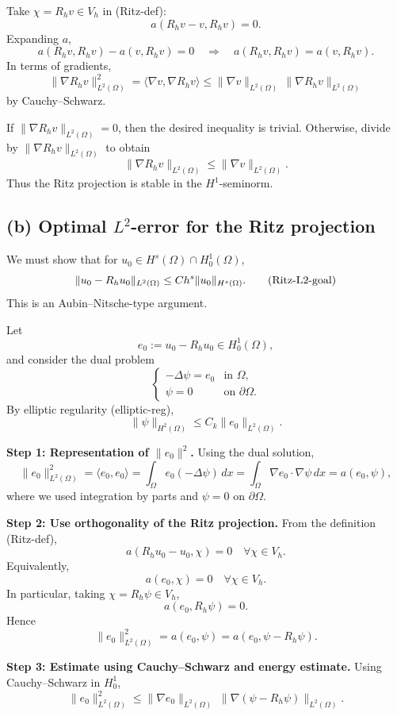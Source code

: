 Take $\chi = R_h v\in V_h$ in (Ritz-def):
\[
    a(R_h v - v, R_h v) = 0.
\]
Expanding $a$,
\[
    a(R_h v, R_h v) - a(v,R_h v) = 0
    \quad\Longrightarrow\quad
    a(R_h v,R_h v) = a(v,R_h v).
\]
In terms of gradients,
\[
    \|\nabla R_h v\|_{L^2(\Omega)}^2
    = \langle \nabla v,\nabla R_h v\rangle
    \le \|\nabla v\|_{L^2(\Omega)}\,\|\nabla R_h v\|_{L^2(\Omega)}
\]
by Cauchy--Schwarz.

If $\|\nabla R_h v\|_{L^2(\Omega)}=0$, then the desired inequality is trivial.
Otherwise, divide by $\|\nabla R_h v\|_{L^2(\Omega)}$ to obtain
\[
    \|\nabla R_h v\|_{L^2(\Omega)} \le \|\nabla v\|_{L^2(\Omega)}.
\]
Thus the Ritz projection is stable in the $H^1$-seminorm.

\subsection*{(b) Optimal $L^2$-error for the Ritz projection}

We must show that for $u_0\in H^s(\Omega)\cap H_0^1(\Omega)$,
\[
    \|u_0 - R_h u_0\|_{L^2(\Omega)} \le C h^s \|u_0\|_{H^s(\Omega)}. \tag{\text{Ritz-L2-goal}}
\]
This is an Aubin--Nitsche-type argument.

Let
\[
    e_0 := u_0 - R_h u_0 \in H_0^1(\Omega),
\]
and consider the dual problem
\[
    \begin{cases}
        -\Delta \psi = e_0 & \text{in }\Omega,         \\
        \psi = 0           & \text{on }\partial\Omega.
    \end{cases}
\]
By elliptic regularity (elliptic-reg),
\[
    \|\psi\|_{H^2(\Omega)} \le C_k \|e_0\|_{L^2(\Omega)}.
\]

\textbf{Step 1: Representation of $\|e_0\|^2$.}
Using the dual solution,
\[
    \|e_0\|_{L^2(\Omega)}^2
    = \langle e_0, e_0\rangle
    = \int_\Omega e_0(-\Delta\psi)\,dx
    = \int_\Omega \nabla e_0\cdot\nabla\psi\,dx
    = a(e_0,\psi),
\]
where we used integration by parts and $\psi=0$ on $\partial\Omega$.

\textbf{Step 2: Use orthogonality of the Ritz projection.}
From the definition (Ritz-def),
\[
    a(R_h u_0 - u_0,\chi) = 0\quad\forall \chi\in V_h.
\]
Equivalently,
\[
    a(e_0,\chi) = 0\quad\forall \chi\in V_h.
\]
In particular, taking $\chi = R_h\psi\in V_h$,
\[
    a(e_0,R_h\psi) = 0.
\]
Hence
\[
    \|e_0\|_{L^2(\Omega)}^2
    = a(e_0,\psi)
    = a(e_0,\psi - R_h\psi).
\]

\textbf{Step 3: Estimate using Cauchy--Schwarz and energy estimate.}
Using Cauchy--Schwarz in $H_0^1$,
\[
    \|e_0\|_{L^2(\Omega)}^2
    \le \|\nabla e_0\|_{L^2(\Omega)}\;\|\nabla(\psi - R_h\psi)\|_{L^2(\Omega)}.
\]

